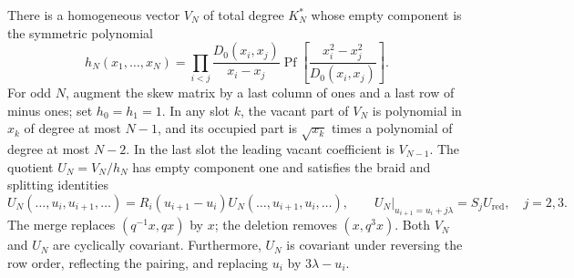\begin{lemma}\label{lem:02-vacuum-polynomial}
There is a homogeneous vector $V_N$ of total degree $K_N^*$ whose
empty component is the symmetric polynomial
\begin{equation}\label{eq:02-h-pfaffian}
 h_N(x_1,\ldots,x_N)=
 \prod_{i<j}\frac{D_0(x_i,x_j)}{x_i-x_j}
 \operatorname{Pf}\left[\frac{x_i^2-x_j^2}{D_0(x_i,x_j)}\right].
\end{equation}
For odd $N$, augment the skew matrix by a last column of ones and a
last row of minus ones; set $h_0=h_1=1$. In any slot $k$, the vacant
part of $V_N$ is polynomial in $x_k$ of degree at most $N-1$, and its
occupied part is $\sqrt{x_k}$ times a polynomial of degree at most
$N-2$. In the last slot the leading vacant coefficient is $V_{N-1}$.
The quotient $U_N=V_N/h_N$ has empty component one and satisfies the
braid and splitting identities
\[
 U_N(\ldots,u_i,u_{i+1},\ldots)
 =R_i(u_{i+1}-u_i)U_N(\ldots,u_{i+1},u_i,\ldots),\qquad
 U_N\big|_{u_{i+1}=u_i+j\lambda}=S_jU_{\mathrm{red}},\quad j=2,3.
\]
The merge replaces $(q^{-1}x,qx)$ by $x$; the deletion removes
$(x,q^3x)$. Both $V_N$ and $U_N$ are cyclically covariant.
Furthermore, $U_N$ is covariant under reversing the row order,
reflecting the pairing, and replacing $u_i$ by $3\lambda-u_i$.
\end{lemma}
